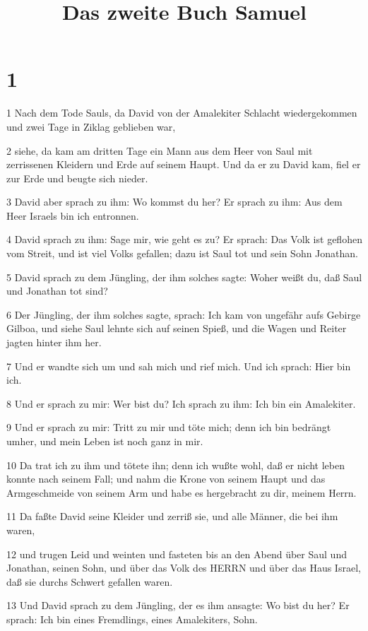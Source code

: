 

\title{Das zweite Buch Samuel}


\chapter{1}

\par 1 Nach dem Tode Sauls, da David von der Amalekiter Schlacht wiedergekommen und zwei Tage in Ziklag geblieben war,
\par 2 siehe, da kam am dritten Tage ein Mann aus dem Heer von Saul mit zerrissenen Kleidern und Erde auf seinem Haupt. Und da er zu David kam, fiel er zur Erde und beugte sich nieder.
\par 3 David aber sprach zu ihm: Wo kommst du her? Er sprach zu ihm: Aus dem Heer Israels bin ich entronnen.
\par 4 David sprach zu ihm: Sage mir, wie geht es zu? Er sprach: Das Volk ist geflohen vom Streit, und ist viel Volks gefallen; dazu ist Saul tot und sein Sohn Jonathan.
\par 5 David sprach zu dem Jüngling, der ihm solches sagte: Woher weißt du, daß Saul und Jonathan tot sind?
\par 6 Der Jüngling, der ihm solches sagte, sprach: Ich kam von ungefähr aufs Gebirge Gilboa, und siehe Saul lehnte sich auf seinen Spieß, und die Wagen und Reiter jagten hinter ihm her.
\par 7 Und er wandte sich um und sah mich und rief mich. Und ich sprach: Hier bin ich.
\par 8 Und er sprach zu mir: Wer bist du? Ich sprach zu ihm: Ich bin ein Amalekiter.
\par 9 Und er sprach zu mir: Tritt zu mir und töte mich; denn ich bin bedrängt umher, und mein Leben ist noch ganz in mir.
\par 10 Da trat ich zu ihm und tötete ihn; denn ich wußte wohl, daß er nicht leben konnte nach seinem Fall; und nahm die Krone von seinem Haupt und das Armgeschmeide von seinem Arm und habe es hergebracht zu dir, meinem Herrn.
\par 11 Da faßte David seine Kleider und zerriß sie, und alle Männer, die bei ihm waren,
\par 12 und trugen Leid und weinten und fasteten bis an den Abend über Saul und Jonathan, seinen Sohn, und über das Volk des HERRN und über das Haus Israel, daß sie durchs Schwert gefallen waren.
\par 13 Und David sprach zu dem Jüngling, der es ihm ansagte: Wo bist du her? Er sprach: Ich bin eines Fremdlings, eines Amalekiters, Sohn.
